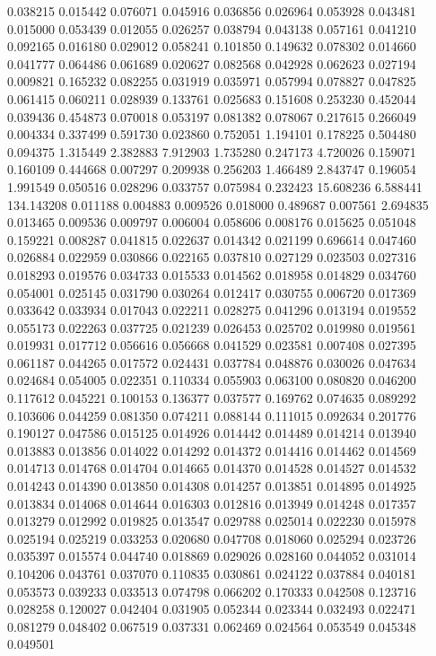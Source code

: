 0.038215
0.015442
0.076071
0.045916
0.036856
0.026964
0.053928
0.043481
0.015000
0.053439
0.012055
0.026257
0.038794
0.043138
0.057161
0.041210
0.092165
0.016180
0.029012
0.058241
0.101850
0.149632
0.078302
0.014660
0.041777
0.064486
0.061689
0.020627
0.082568
0.042928
0.062623
0.027194
0.009821
0.165232
0.082255
0.031919
0.035971
0.057994
0.078827
0.047825
0.061415
0.060211
0.028939
0.133761
0.025683
0.151608
0.253230
0.452044
0.039436
0.454873
0.070018
0.053197
0.081382
0.078067
0.217615
0.266049
0.004334
0.337499
0.591730
0.023860
0.752051
1.194101
0.178225
0.504480
0.094375
1.315449
2.382883
7.912903
1.735280
0.247173
4.720026
0.159071
0.160109
0.444668
0.007297
0.209938
0.256203
1.466489
2.843747
0.196054
1.991549
0.050516
0.028296
0.033757
0.075984
0.232423
15.608236
6.588441
134.143208
0.011188
0.004883
0.009526
0.018000
0.489687
0.007561
2.694835
0.013465
0.009536
0.009797
0.006004
0.058606
0.008176
0.015625
0.051048
0.159221
0.008287
0.041815
0.022637
0.014342
0.021199
0.696614
0.047460
0.026884
0.022959
0.030866
0.022165
0.037810
0.027129
0.023503
0.027316
0.018293
0.019576
0.034733
0.015533
0.014562
0.018958
0.014829
0.034760
0.054001
0.025145
0.031790
0.030264
0.012417
0.030755
0.006720
0.017369
0.033642
0.033934
0.017043
0.022211
0.028275
0.041296
0.013194
0.019552
0.055173
0.022263
0.037725
0.021239
0.026453
0.025702
0.019980
0.019561
0.019931
0.017712
0.056616
0.056668
0.041529
0.023581
0.007408
0.027395
0.061187
0.044265
0.017572
0.024431
0.037784
0.048876
0.030026
0.047634
0.024684
0.054005
0.022351
0.110334
0.055903
0.063100
0.080820
0.046200
0.117612
0.045221
0.100153
0.136377
0.037577
0.169762
0.074635
0.089292
0.103606
0.044259
0.081350
0.074211
0.088144
0.111015
0.092634
0.201776
0.190127
0.047586
0.015125
0.014926
0.014442
0.014489
0.014214
0.013940
0.013883
0.013856
0.014022
0.014292
0.014372
0.014416
0.014462
0.014569
0.014713
0.014768
0.014704
0.014665
0.014370
0.014528
0.014527
0.014532
0.014243
0.014390
0.013850
0.014308
0.014257
0.013851
0.014895
0.014925
0.013834
0.014068
0.014644
0.016303
0.012816
0.013949
0.014248
0.017357
0.013279
0.012992
0.019825
0.013547
0.029788
0.025014
0.022230
0.015978
0.025194
0.025219
0.033253
0.020680
0.047708
0.018060
0.025294
0.023726
0.035397
0.015574
0.044740
0.018869
0.029026
0.028160
0.044052
0.031014
0.104206
0.043761
0.037070
0.110835
0.030861
0.024122
0.037884
0.040181
0.053573
0.039233
0.033513
0.074798
0.066202
0.170333
0.042508
0.123716
0.028258
0.120027
0.042404
0.031905
0.052344
0.023344
0.032493
0.022471
0.081279
0.048402
0.067519
0.037331
0.062469
0.024564
0.053549
0.045348
0.049501

